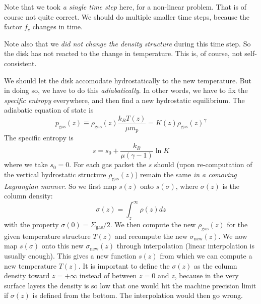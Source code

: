 \documentclass{book}
\begin{document}
Note that we took {\em a single time step} here, for a non-linear problem. That
is of course not quite correct. We should do multiple smaller time steps, because
the factor $f_c$ changes in time.

Note also that we {\em did not change the density structure} during this time
step. So the disk has not reacted to the change in temperature. This is, of
course, not self-consistent.

We should let the disk accomodate hydrostatically to the new temperature. But in
doing so, we have to do this {\em adiabatically}. In other words, we have to fix the
{\em specific entropy} everywhere, and then find a new hydrostatic equilibrium.
The adiabatic equation of state is
\begin{equation}
p_{\mathrm{gas}}(z) \equiv \rho_{\mathrm{gas}}(z)\frac{k_B T(z)}{\mu m_p} = K(z) \rho_{\mathrm{gas}}(z)^\gamma
\end{equation}
The specific entropy is
\begin{equation}
s = s_0 + \frac{k_B}{\mu(\gamma-1)}\ln K
\end{equation}
where we take $s_0=0$. For each gas packet the $s$ should (upon re-computation of
the vertical hydrostatic structure $\rho_{\mathrm{gas}}(z)$) remain the same
{\em in a comoving Lagrangian manner}. So we first map $s(z)$ onto $s(\sigma)$,
where $\sigma(z)$ is the column density:
\begin{equation}
\sigma(z) = \int_z^\infty \rho(z)dz
\end{equation}
with the property $\sigma(0)=\Sigma_{\mathrm{gas}}/2$. We then
compute the new $\rho_{\mathrm{gas}}(z)$ for the given temperature structure
$T(z)$ and recompute the new $\sigma_{\mathrm{new}}(z)$. We now map $s(\sigma)$
onto this new $\sigma_{\mathrm{new}}(z)$ through interpolation (linear interpolation
is usually enough). This gives a new function $s(z)$ from which we can compute
a new temperature $T(z)$. It is important to define the $\sigma(z)$ as the column
density toward $z=+\infty$ instead of between $z=0$ and $z$, because in the very
surface layers the density is so low that one would hit the machine precision limit
if $\sigma(z)$ is defined from the bottom. The interpolation would then go wrong.
\end{document}
